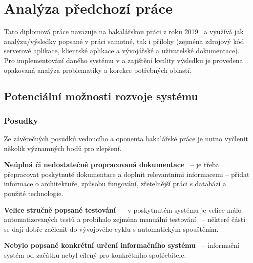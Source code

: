 
\chapter{Analýza předchozí práce}\label{ch:analysis}


Tato diplomová práce navazuje na bakalářskou práci z roku 2019~\cite{bachelorthesis} a využívá jak analýzu/výsledky popsané v práci samotné, tak i přílohy (zejména zdrojový kód serverové aplikace, klientské aplikace a vývojářské a uživatelské dokumentace).
Pro implementování daného systému v  a zajištění kvality výsledku je provedena opakovaná analýza problematiky a korekce potřebných oblastí.



\section{Potenciální možnosti rozvoje systému}



\subsection{Posudky}
Ze závěrečných posudků vedoucího a oponenta bakalářské práce je nutno vyčlenit několik významných bodů pro zlepšení.

\begin{ul}
   \item
   \textbf{Neúplná či nedostatečně propracovaná dokumentace~\cite{bachelorthesisreportsupervisor}} – je třeba přepracovat poskytnuté dokumentace a doplnit relevantními informacemi – přidat informace o architektuře, způsobu fungování, zřetelnější práci s databází a použité technologie.

   \newpage

   \item
   \textbf{Velice stručně popsané testování~\cite{bachelorthesisreportreviewer}} – v poskytnutém systému je velice málo automatizovaných testů a probíhalo zejména manuální testování~\cite{bachelorthesis} – některé části se dají dobře začlenit do vývojového cyklu s automatickým spouštěním.

   \item
   \textbf{Nebylo popsané konkrétní určení informačního systému~\cite{bachelorthesisreportreviewer}} – informační systém od začátku nebyl cílený pro konkrétního spotřebitele.
\end{ul}

